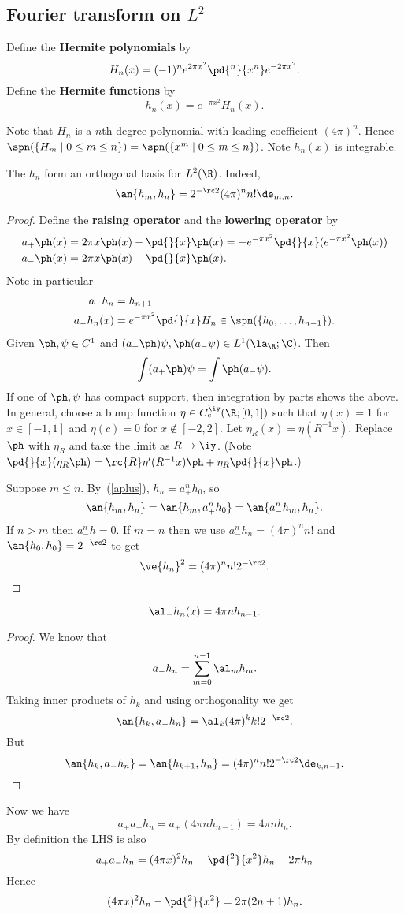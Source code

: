 
\subsection{Fourier transform on $L^2$}
\begin{df}
Define the \textbf{Hermite polynomials} by
\[
H_n(x)=(-1)^n e^{2\pi x^2} \pd{^n}{x^n}e^{-2\pi x^2}.
\]
Define the \textbf{Hermite functions} by
\[
h_n(x)=e^{-\pi x^2} H_n(x).
\]
\end{df}
Note that $H_n$ is a $n$th degree polynomial with leading coefficient $(4\pi)^n$. Hence $\spn(\{H_m\mid 0\le m\le n\})=\spn(\{x^m\mid 0\le m\le n\})$. Note $h_n(x)$ is integrable.

\begin{lem}
The $h_n$ form an orthogonal basis for $L^2(\R)$. Indeed,
\[
\an{h_m,h_n}=2^{-\rc 2} (4\pi )^n n!\de_{m,n}.
\]
\end{lem}
\begin{proof}
Define the \textbf{raising operator} and the \textbf{lowering operator} by
\begin{align*}
a_+\ph(x)&=2\pi x\ph (x)-\pd{}{x} \ph(x)=-e^{-\pi x^2} \pd{}{x}(e^{-\pi x^2}\ph(x))\\
a_-\ph(x)&=2\pi x\ph(x)+\pd{}{x}\ph(x).
\end{align*}
Note in particular
\begin{align}
\label{aplus}
a_+h_n&=h_{n+1}\\
\label{aminus}
a_-h_n(x)&=e^{-\pi x^2} \pd{}{x} H_n\in \spn(\{h_0,\ldots, h_{n-1}\}).
\end{align}
Given $\ph,\psi\in C^1$ and $(a_+\ph)\psi,\ph(a_-\psi)\in L^1(\la_{\R};\C)$. Then
\[
\int (a_+\ph)\psi=\int \ph(a_-\psi).
\]
If one of $\ph,\psi$ has compact support, then integration by parts shows the above. In general, choose a bump function $\eta\in C^{\iy}_c(\R;[0,1])$ such that $\eta(x)=1$ for $x\in[-1,1]$ and $\eta(c)=0$ for $x\nin [-2,2]$. Let $\eta_{R}(x)=\eta(R^{-1}x)$.  Replace $\ph$ with $\eta_R$ and take the limit as $R\to \iy$. (Note $\pd{}{x} (\eta_R \ph)=\rc{R} \eta'(R^{-1} x)\ph+\eta_R\pd{}{x}\ph$.)

Suppose $m\le n$. By~(\ref{aplus}), $h_n=a_+^nh_0$, so
\[
\an{h_m,h_n}=\an{h_m,a_+^n h_0}=\an{a_-^nh_m, h_n}.
\]
If $n>m$ then $a_-^nh=0$. If $m=n$ then we use $a_-^nh_n=(4\pi)^n n!$ and $\an{h_0,h_0}=2^{-\rc 2}$ to get 
\[
\ve{h_n}^2=(4\pi )^n n! 2^{-\rc 2}.
\]
\end{proof}
\begin{lem}
\[\al_-h_n(x)=4\pi n h_{n-1}.\]
\end{lem}
\begin{proof}
We know that 
\[
a_-h_n=\sum_{m=0}^{n-1} \al_m h_m.
\]
Taking inner products of $h_k$ and using orthogonality we get
\[
\an{h_k,a_-h_n}=\al_k (4\pi)^k k! 2^{-\rc 2}.
\]
But
\[
\an{h_k,a_-h_n}=\an{h_{k+1},h_n}=(4\pi)^n n! 2^{-\rc 2} \de_{k,n-1}.
\]
\end{proof}
Now we have
\[
a_+a_-h_n=a_+(4\pi n h_{n-1})=4\pi nh_n.
\]
By definition the LHS is also
\[
a_+a_-h_n=(4\pi x)^2 h_n-\pd{^2}{x^2}h_n-2\pi h_n
\]
Hence
\[
(4\pi x)^2h_n -\pd{^2}{x^2}=2\pi (2n+1)h_n.
\]

